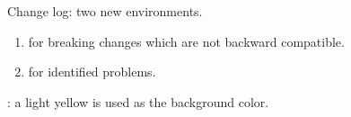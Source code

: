 \documentclass{tutodoc}
\begin{document}
\small

\begin{tdocnew}
    \item Change log: two new environments.
    \begin{enumerate}
        \item {} for breaking changes which are not backward compatible.

        \item {} for identified problems.
    \end{enumerate}

    \item {}: a light yellow is used as the background color.
\end{tdocnew}
\end{document}
